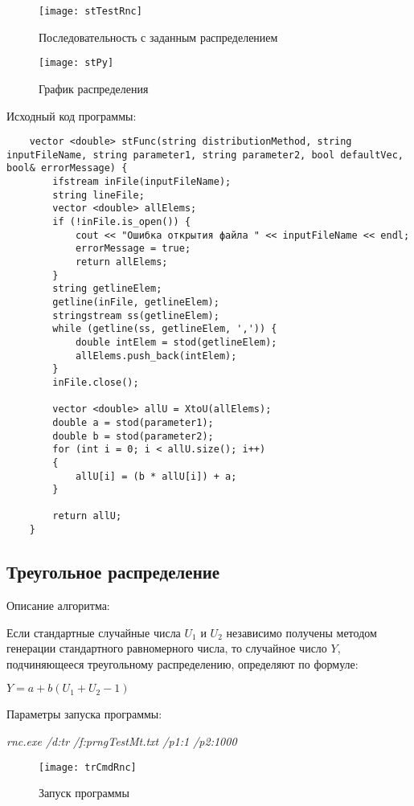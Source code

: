 \documentclass[bachelor, och, coursework]{shiza}
\begin{document}
	\begin{figure}[H]
		\centering
		\texttt{[image: stTestRnc]}
		\caption{Последовательность с заданным распределением}
		\label{fig:stTestRnc}
	\end{figure}

	\begin{figure}[H]
		\centering
		\texttt{[image: stPy]}
		\caption{График распределения}
		\label{fig:stPy}
	\end{figure}
	
	Исходный код программы:
	
	\begin{verbatim}
	vector <double> stFunc(string distributionMethod, string inputFileName, string parameter1, string parameter2, bool defaultVec, bool& errorMessage) {
		ifstream inFile(inputFileName);
		string lineFile;
		vector <double> allElems;
		if (!inFile.is_open()) {
			cout << "Ошибка открытия файла " << inputFileName << endl;
			errorMessage = true;
			return allElems;
		}
		string getlineElem;
		getline(inFile, getlineElem);
		stringstream ss(getlineElem);
		while (getline(ss, getlineElem, ',')) {
			double intElem = stod(getlineElem);
			allElems.push_back(intElem);
		}
		inFile.close();
		
		vector <double> allU = XtoU(allElems);
		double a = stod(parameter1);
		double b = stod(parameter2);
		for (int i = 0; i < allU.size(); i++)
		{
			allU[i] = (b * allU[i]) + a;
		}
		
		return allU;
	}
	\end{verbatim}

	\subsection{Треугольное распределение}
	
	Описание алгоритма:
	
	Если стандартные случайные числа $U_1$ и $U_2$ независимо получены методом генерации стандартного равномерного числа, то случайное число $Y$, подчиняющееся треугольному распределению, определяют по формуле:
	
	\begin{center}
		$Y = a + b(U_1 + U_2 - 1)$
	\end{center}

	Параметры запуска программы:
	
	\textit{rnc.exe /d:tr /f:prngTestMt.txt /p1:1 /p2:1000}
	
	\begin{figure}[H]
		\centering
		\texttt{[image: trCmdRnc]}
		\caption{Запуск программы}
		\label{fig:trCmdRnc}
	\end{figure}
	
\end{document}
